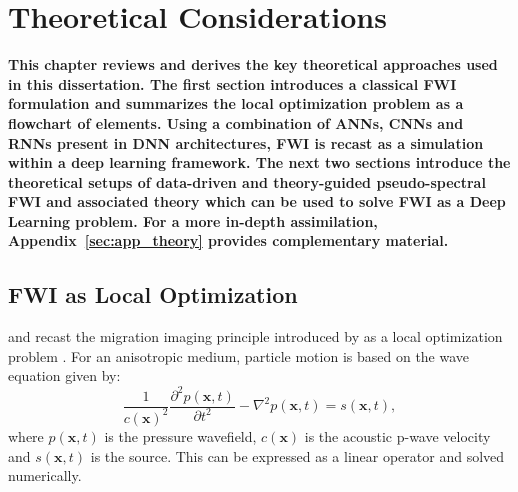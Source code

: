\chapter{Theoretical Considerations}

\textbf{This chapter reviews and derives the key theoretical approaches used in this dissertation. The first section introduces a classical FWI formulation and summarizes the local optimization problem as a flowchart of elements. Using a combination of ANNs, CNNs and RNNs present in  DNN architectures, FWI is recast as a simulation within a deep learning framework. The next two sections introduce the theoretical setups of data-driven and theory-guided pseudo-spectral FWI and associated theory which can be used to solve FWI as a Deep Learning problem. For a more in-depth assimilation, Appendix~\ref{sec:app_theory} provides complementary material.}

\section{FWI as Local Optimization}\label{sec:theory_theory_fwi_as_local_optimization}
\cite{Lailly1983} and \cite{Tarantola1984a} recast the migration imaging principle introduced by \cite{Claerbout1971} as a local optimization problem \citep{Virieux2009}. For an anisotropic medium, particle motion is based on the wave equation given by:
\begin{equation}\label{eq:wave_equation}
	\frac{1}{c(\boldsymbol{x})^2}\frac{\partial^2p(\boldsymbol{x},t)}{\partial t^2} - \nabla^2 p(\boldsymbol{x},t) = s(\boldsymbol{x},t),
\end{equation}
where $p(\boldsymbol{x},t)$ is the pressure wavefield, $c(\boldsymbol{x})$ is the acoustic p-wave velocity and $s(\boldsymbol{x},t)$ is the source. This can be expressed as a linear operator and solved numerically.

